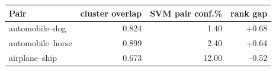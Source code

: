 \begin{tabular}{lrrr}
\toprule
Pair & cluster overlap & SVM pair conf.\% & rank gap \\
\midrule
automobile--dog & 0.824 & 1.40 & +0.68 \\
automobile--horse & 0.899 & 2.40 & +0.64 \\
airplane--ship & 0.673 & 12.00 & -0.52 \\
\bottomrule
\end{tabular}
